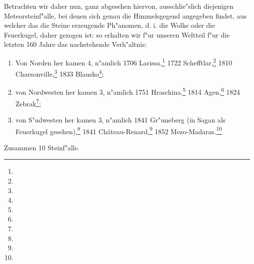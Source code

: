 \documentclass[a4paper, 8pt, oneside, polutonikogreek, german]{article}
\begin{document}
Betrachten wir daher nun, ganz abgesehen hiervon, ausschlie"slich diejenigen Meteorsteinf"alle, bei denen sich genau die Himmelsgegend angegeben findet, aus welcher das die Steine erzeugende Ph"anomen, d. i. die Wolke oder die Feuerkugel, daher gezogen ist: so erhalten wir f"ur unseren Weltteil f"ur die letzten 160 Jahre das nachstehende Verh"altnis:
\begin{enumerate}
    \item Von Norden her kamen 4, n"amlich 1706 Larissa,\footnote{} 1722 Schefftlar,\footnote{} 1810 Charsonville,\footnote{} 1833 Blansko\footnote{};
    \item von Nordwesten her kamen 3, n"amlich 1751 Hraschina,\footnote{} 1814 Agen,\footnote{} 1824 Zebrak\footnote{};
    \item von S"udwesten her kamen 3, n"amlich 1841 Gr"uneberg (in Sagan als Feuerkugel gesehen),\footnote{} 1841 Château-Renard,\footnote{} 1852 Mezo-Madaras.\footnote{}
\end{enumerate}
\begin{center}
Zusammen 10 Steinf"alle.
\end{center}
\end{document}
